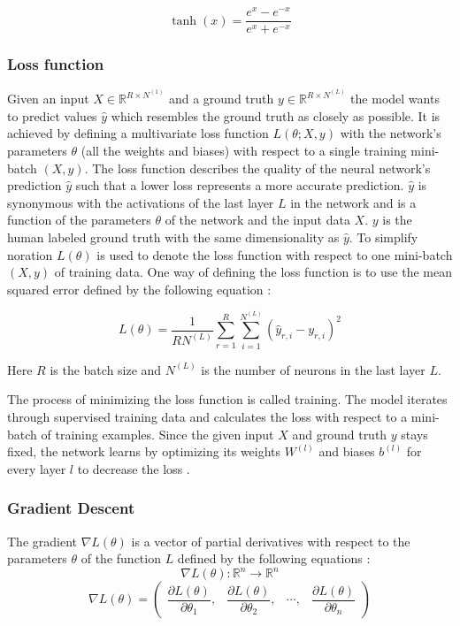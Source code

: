 \documentclass[a4paper, twoside]{article}
\newcommand*{\pd}[2]{\ensuremath{\dfrac{\partial #1}{\partial #2}}}
\begin{document}
\begin{equation}\label{tanh}
\tanh{(x)} = \frac{e^x-e^{-x}}{e^x+e^{-x}}
\end{equation}

\subsubsection{Loss function}
Given an input $X \in \mathbb{R}^{R \times N^{(1)}}$ and a ground truth $y \in \mathbb{R}^{R \times N^{(L)}}$ the model wants to predict values $\hat{y}$ which resembles the ground truth as closely as possible. It is achieved by defining a multivariate loss function $L(\theta; X, y)$  with the network's parameters $\theta$ (all the weights and biases) with respect to a single training mini-batch $(X, y)$. The loss function describes the quality of the neural network's prediction $\hat{y}$ such that a lower loss represents a more accurate prediction. $\hat{y}$ is synonymous with the activations of the last layer $L$ in the network and is a function of the parameters $\theta$ of the network and the input data $X$. $y$ is the human labeled ground truth with the same dimensionality as $\hat{y}$. To simplify noration $L(\theta)$ is used to denote the loss function with respect to one mini-batch $(X, y)$ of training data. One way of defining the loss function is to use the mean squared error defined by the following equation \cite{cs231n}:

\begin{equation}\label{MSE}
L(\theta) = \frac{1}{RN^{(L)}} \sum^{R}_{r=1} \sum^{N^{(L)}}_{i=1} (\hat{y}_{r,i}-y_{r,i})^2
\end{equation}

Here $R$ is the batch size and $N^{(L)}$ is the number of neurons in the last layer $L$.

The process of minimizing the loss function is called training. The model iterates through supervised training data and calculates the loss with respect to a mini-batch of training examples. Since the given input $X$ and ground truth $y$ stays fixed, the network learns by optimizing its weights $W^{(l)}$ and biases $b^{(l)}$ for every layer $l$ to decrease the loss \cite{cs231n} \cite{wikiStanford}.

\subsubsection{Gradient Descent}
The gradient $\nabla L(\theta)$ is a vector of partial derivatives with respect to the parameters $\theta$ of the function $L$ defined by the following equations \cite{gradient} \cite{convmath}:
\begin{equation}\label{EQgradientspace}
\nabla L(\theta) : \mathbb{R}^n \to \mathbb{R}^n
\end{equation}
\begin{equation}\label{EQgradientvector}
\nabla L(\theta) = 
	\begin{pmatrix} 
		\pd{L(\theta)}{\theta_{1}}, & 
		\pd{L(\theta)}{\theta_{2}}, &
		\cdots, &
		\pd{L(\theta)}{\theta_{n}}
		
		\end{pmatrix}
\end{equation}
\end{document}
